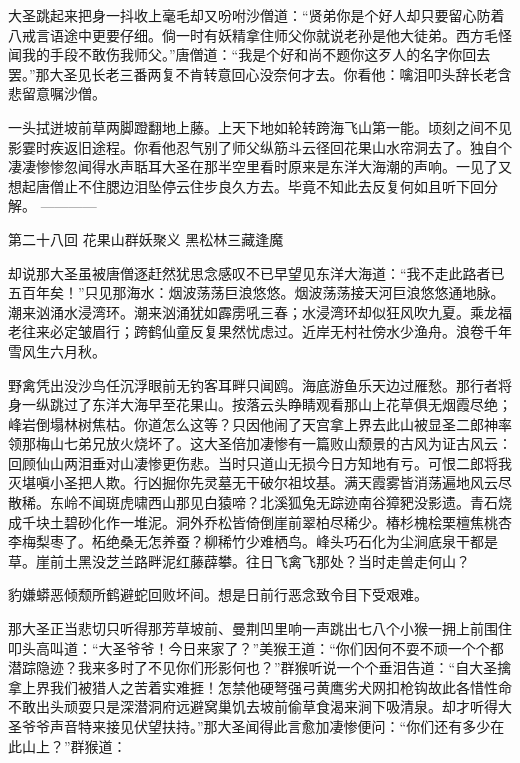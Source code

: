 \documentclass[12pt,UTF8]{ctexbook}
\begin{document}
大圣跳起来把身一抖收上毫毛却又吩咐沙僧道：“贤弟你是个好人却只要留心防着八戒言语途中更要仔细。倘一时有妖精拿住师父你就说老孙是他大徒弟。西方毛怪闻我的手段不敢伤我师父。”唐僧道：“我是个好和尚不题你这歹人的名字你回去罢。”那大圣见长老三番两复不肯转意回心没奈何才去。你看他：噙泪叩头辞长老含悲留意嘱沙僧。

一头拭迸坡前草两脚蹬翻地上藤。上天下地如轮转跨海飞山第一能。顷刻之间不见影霎时疾返旧途程。你看他忍气别了师父纵筋斗云径回花果山水帘洞去了。独自个凄凄惨惨忽闻得水声聒耳大圣在那半空里看时原来是东洋大海潮的声响。一见了又想起唐僧止不住腮边泪坠停云住步良久方去。毕竟不知此去反复何如且听下回分解。
------------

第二十八回 花果山群妖聚义 黑松林三藏逢魔

却说那大圣虽被唐僧逐赶然犹思念感叹不已早望见东洋大海道：“我不走此路者已五百年矣！”只见那海水：烟波荡荡巨浪悠悠。烟波荡荡接天河巨浪悠悠通地脉。潮来汹涌水浸湾环。潮来汹涌犹如霹雳吼三春；水浸湾环却似狂风吹九夏。乘龙福老往来必定皱眉行；跨鹤仙童反复果然忧虑过。近岸无村社傍水少渔舟。浪卷千年雪风生六月秋。

野禽凭出没沙鸟任沉浮眼前无钓客耳畔只闻鸥。海底游鱼乐天边过雁愁。那行者将身一纵跳过了东洋大海早至花果山。按落云头睁睛观看那山上花草俱无烟霞尽绝；峰岩倒塌林树焦枯。你道怎么这等？只因他闹了天宫拿上界去此山被显圣二郎神率领那梅山七弟兄放火烧坏了。这大圣倍加凄惨有一篇败山颓景的古风为证古风云：回顾仙山两泪垂对山凄惨更伤悲。当时只道山无损今日方知地有亏。可恨二郎将我灭堪嗔小圣把人欺。行凶掘你先灵墓无干破尔祖坟基。满天霞雾皆消荡遍地风云尽散稀。东岭不闻斑虎啸西山那见白猿啼？北溪狐兔无踪迹南谷獐豝没影遗。青石烧成千块土碧砂化作一堆泥。洞外乔松皆倚倒崖前翠柏尽稀少。椿杉槐桧栗檀焦桃杏李梅梨枣了。柘绝桑无怎养蚕？柳稀竹少难栖鸟。峰头巧石化为尘涧底泉干都是草。崖前土黑没芝兰路畔泥红藤薜攀。往日飞禽飞那处？当时走兽走何山？

豹嫌蟒恶倾颓所鹤避蛇回败坏间。想是日前行恶念致令目下受艰难。

那大圣正当悲切只听得那芳草坡前、曼荆凹里响一声跳出七八个小猴一拥上前围住叩头高叫道：“大圣爷爷！今日来家了？”美猴王道：“你们因何不耍不顽一个个都潜踪隐迹？我来多时了不见你们形影何也？”群猴听说一个个垂泪告道：“自大圣擒拿上界我们被猎人之苦着实难捱！怎禁他硬弩强弓黄鹰劣犬网扣枪钩故此各惜性命不敢出头顽耍只是深潜洞府远避窝巢饥去坡前偷草食渴来涧下吸清泉。却才听得大圣爷爷声音特来接见伏望扶持。”那大圣闻得此言愈加凄惨便问：“你们还有多少在此山上？”群猴道：
\end{document}
